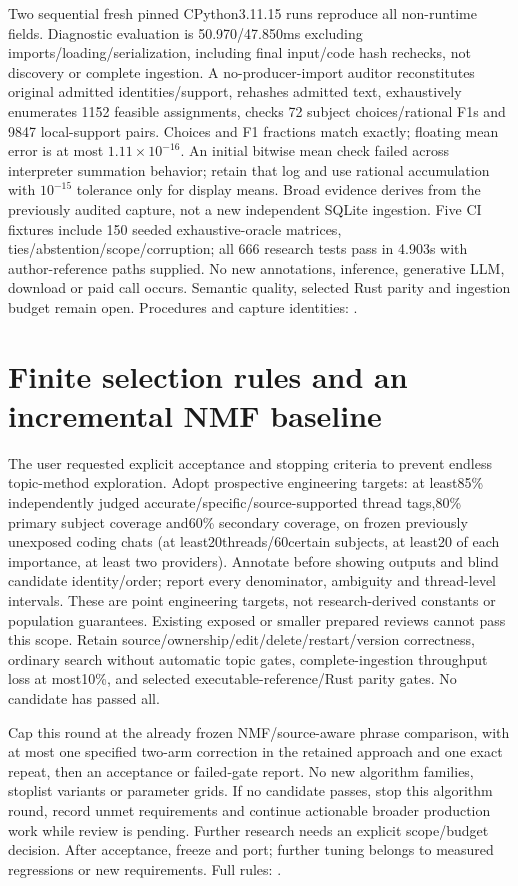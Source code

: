 \documentclass[11pt]{article}
\begin{document}
Two sequential fresh pinned CPython3.11.15 runs reproduce all non-runtime fields.
Diagnostic evaluation is 50.970/47.850ms excluding imports/loading/serialization,
including final input/code hash rechecks, not discovery or complete ingestion.
A no-producer-import auditor reconstitutes original admitted identities/support,
rehashes admitted text, exhaustively enumerates 1152 feasible assignments,
checks 72 subject choices/rational F1s and 9847 local-support pairs. Choices and
F1 fractions match exactly; floating mean error is at most $1.11\times10^{-16}$.
An initial bitwise mean check failed across interpreter summation behavior;
retain that log and use rational accumulation with $10^{-15}$ tolerance only
for display means. Broad evidence derives from the previously audited capture,
not a new independent SQLite ingestion. Five CI fixtures include 150 seeded
exhaustive-oracle matrices, ties/abstention/scope/corruption; all 666 research tests
pass in 4.903s with author-reference paths supplied. No new annotations,
inference, generative LLM, download or paid call occurs. Semantic quality,
selected Rust parity and ingestion budget remain open. Procedures and capture
identities: .

\section{Finite selection rules and an incremental NMF baseline}
The user requested explicit acceptance and stopping criteria to prevent endless
topic-method exploration. Adopt prospective engineering targets: at least85\%
independently judged accurate/specific/source-supported thread tags,80\% primary
subject coverage and60\% secondary coverage, on frozen previously unexposed
coding chats (at least20threads/60certain subjects, at least20 of each importance,
at least two providers). Annotate before showing outputs and blind candidate
identity/order; report every denominator, ambiguity and thread-level intervals.
These are point engineering targets, not research-derived constants or population
guarantees. Existing exposed or smaller prepared reviews cannot pass this scope.
Retain source/ownership/edit/delete/restart/version correctness, ordinary search
without automatic topic gates, complete-ingestion throughput loss at most10\%,
and selected executable-reference/Rust parity gates. No candidate has passed all.

Cap this round at the already frozen NMF/source-aware phrase comparison, with
at most one specified two-arm correction in the retained approach and one exact
repeat, then an acceptance or failed-gate report. No new algorithm families,
stoplist variants or parameter grids. If no candidate passes, stop this algorithm
round, record unmet requirements and continue actionable broader production work
while review is pending. Further research needs an explicit scope/budget decision.
After acceptance, freeze and port; further tuning belongs to measured regressions
or new requirements. Full rules: .
\end{document}
